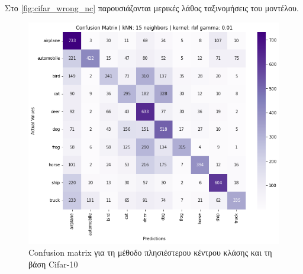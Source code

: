 \documentclass[a4paper]{article}
\begin{document}
Στο \autoref{fig:cifar_wrong_nc} παρουσιάζονται μερικές λάθος ταξινομήσεις του
μοντέλου.

\begin{figure}[H]
    \centering
    \includegraphics[width=0.6\linewidth]{cifar/confusion_matrix_knn.png}
    \caption{Confusion matrix για τη μέθοδο πλησιέστερου κέντρου κλάσης και τη
    βάση Cifar-10}
    \label{fig:cifar_confusion_nc}
\end{figure}
\end{document}

